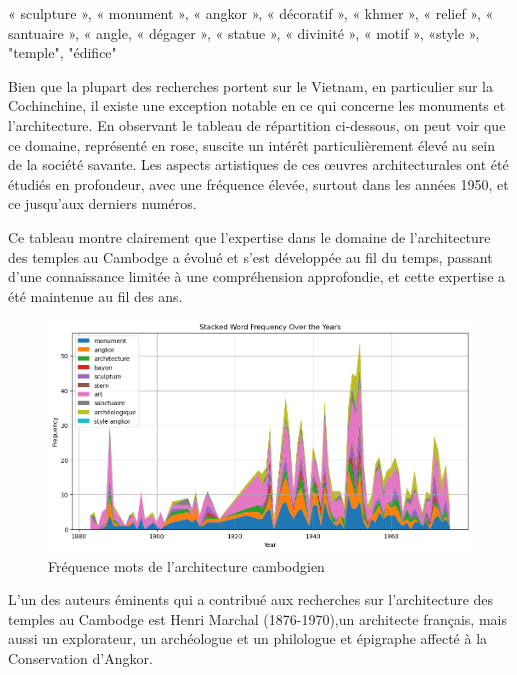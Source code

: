 « sculpture », « monument », « angkor », « décoratif », « khmer », « relief », « santuaire », « angle, « dégager », « statue », « divinité », « motif », «style », "temple", "édifice"

Bien que la plupart des recherches portent sur le Vietnam, en particulier sur la Cochinchine, il existe une exception notable en ce qui concerne les monuments et l'architecture. En observant le tableau de répartition ci-dessous, on peut voir que ce domaine, représenté en rose, suscite un intérêt particulièrement élevé au sein de la société savante. Les aspects artistiques de ces œuvres architecturales ont été étudiés en profondeur, avec une fréquence élevée, surtout dans les années 1950, et ce jusqu'aux derniers numéros. 

Ce tableau montre clairement que l'expertise dans le domaine de l'architecture des temples au Cambodge a évolué et s'est développée au fil du temps, passant d'une connaissance limitée à une compréhension approfondie, et cette expertise a été maintenue au fil des ans.
\begin{figure}[H] %
    \centering
    \includegraphics[width=14cm]{img/stackfreq_year_keyword_cambodge.png}
    \caption{Fréquence mots de l'architecture cambodgien}
    \label{stackfreq_year_keyword_cambodge}
\end{figure}

L'un des auteurs éminents qui a contribué aux recherches sur l'architecture des temples au Cambodge est Henri Marchal (1876-1970),un architecte français, mais aussi un explorateur, un archéologue et un philologue et épigraphe affecté à la Conservation d'Angkor.

